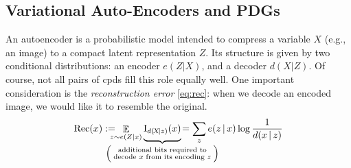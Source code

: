 \documentclass[twoside]{article}
\makeatletter
\theoremstyle{plain}
\theoremstyle{definition}
\DeclareMathOperator*{\Ex}{\mathbb{E}} %
\newcommand\aar{\@ifstar\aar@one@star\aar@plain}
\newcommand\aar@one@star{\@ifstar\aar@resize{\aar@plain*}}
\newcommand\aar@resize[1]{\sbox{\aar@content}{#1}\scaleleftright[3.8ex]
		{\Biggl\langle\!\!\!\!\Biggl\langle}{\usebox{\aar@content}}
		{\Biggr\rangle\!\!\!\!\Biggr\rangle}}
\makeatother
\begin{document}
\subsection{Variational Auto-Encoders and PDGs}

An autoencoder is a probabilistic model intended to compress a
variable $X$ (e.g., an image) to a compact latent representation
$Z$.
Its structure is given by two conditional distributions:
an encoder $e(Z | X)$, and a decoder $d(X | Z)$.
Of course, not all pairs of cpds fill this role equally well.
One important consideration is the
\emph{reconstruction error} \eqref{eq:rec}: when we decode an encoded image, we would like it to resemble the original.
\vspace{-0.5em}
\begin{equation}
	\mathrm{Rec}(x) := \!\!\!\!\! \Ex_{z \sim e(Z|x)} \smash{\underbrace{\mathrm I_{d(\!X\!|z)}(x)\vphantom{\Big|}}_{\mathclap{\left(\;\substack{\text{additional bits required to}\\\text{decode $x$ from its encoding  $z$}}\;\right)}}}
	\!= \sum_z e(z \,|\, x) \log \frac1{d(x \,|\, z)}\label{eq:rec}
\end{equation}
\vspace{0.0ex}
%
\end{document}
